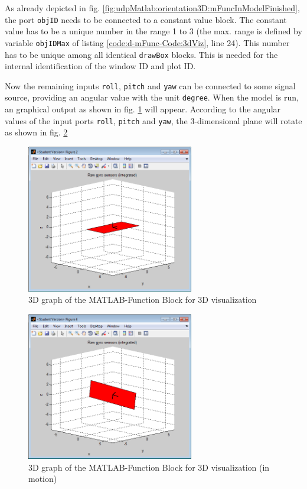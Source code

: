 As already depicted in fig. \ref{fig:udpMatlab:orientation3D:mFuncInModelFinished}, the port \texttt{objID} needs to be connected to a constant value block. The constant value has to be a unique number in the range 1 to 3 (the max. range is defined by variable \texttt{objIDMax} of listing \ref{code:d-mFunc-Code:3dViz}, line 24). This number has to be unique among all identical \texttt{drawBox} blocks. This is needed for the internal identification of the window ID and plot ID.

Now the remaining inputs \texttt{roll}, \texttt{pitch} and \texttt{yaw} can be connected to some signal source, providing an angular value with the unit \texttt{degree}. When the model is run, an graphical output as shown in fig. \ref{fig:udpMatlab:orientation3D:mFuncInModelOutput} will appear. According to the angular values of the input ports \texttt{roll}, \texttt{pitch} and \texttt{yaw}, the 3-dimensional plane will rotate as shown in fig. \ref{fig:udpMatlab:orientation3D:mFuncInModelOutputRot}

\begin{figure}[H]
    \centering
    \includegraphics[width=0.65\textwidth]{fig/ch-matlab-lib/matlabFunctionInModel_output}
    \caption{3D graph of the MATLAB-Function Block for 3D visualization}
    \label{fig:udpMatlab:orientation3D:mFuncInModelOutput}
\end{figure}

\begin{figure}[H]
    \centering
    \includegraphics[width=0.65\textwidth]{fig/ch-matlab-lib/matlabFunctionInModel_outputRot}
    \caption{3D graph of the MATLAB-Function Block for 3D visualization (in motion)}
    \label{fig:udpMatlab:orientation3D:mFuncInModelOutputRot}
\end{figure}